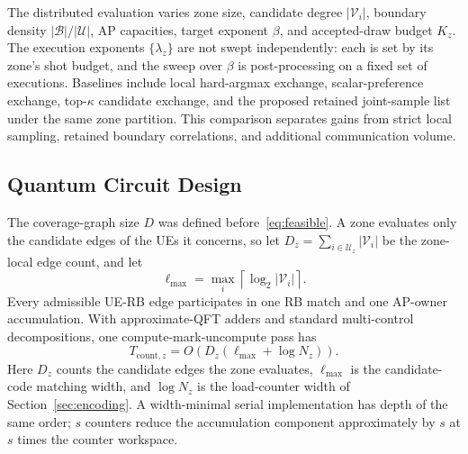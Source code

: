 \documentclass[journal]{IEEEtran}
\newcommand{\calV}{\mathcal{V}}  %
\newcommand{\calU}{\mathcal{U}}  %
\newcommand{\calB}{\mathcal{B}}  %
\begin{document}

The distributed evaluation varies zone size, candidate degree $|\calV_i|$, boundary density $|\calB|/|\calU|$, AP capacities, target exponent $\beta$, and accepted-draw budget $K_z$. The execution exponents $\{\lambda_z\}$ are not swept independently: each is set by its zone's shot budget, and the sweep over $\beta$ is post-processing on a fixed set of executions. Baselines include local hard-argmax exchange, scalar-preference exchange, top-$\kappa$ candidate exchange, and the proposed retained joint-sample list under the same zone partition. This comparison separates gains from strict local sampling, retained boundary correlations, and additional communication volume.

\subsection{Quantum Circuit Design}
\label{sec:complexity}

The coverage-graph size $D$ was defined before~\eqref{eq:feasible}. A zone evaluates only the candidate edges of the UEs it concerns, so let $D_z=\sum_{i\in\calU_z}|\calV_i|$ be the zone-local edge count, and let
\begin{equation}
\label{eq:lmax}
\ell_{\max}=\max_i\left\lceil\log_2|\calV_i|\right\rceil.
\end{equation}
Every admissible UE-RB edge participates in one RB match and one AP-owner accumulation. With approximate-QFT adders and standard multi-control decompositions, one compute-mark-uncompute pass has
\begin{equation}
\label{eq:tcount}
T_{\mathrm{count},z}=
O\!\left(D_z(\ell_{\max}+\log N_z)\right).
\end{equation}
Here $D_z$ counts the candidate edges the zone evaluates, $\ell_{\max}$ is the candidate-code matching width, and $\log N_z$ is the load-counter width of Section~\ref{sec:encoding}. A width-minimal serial implementation has depth of the same order; $s$ counters reduce the accumulation component approximately by $s$ at $s$ times the counter workspace.
\end{document}
